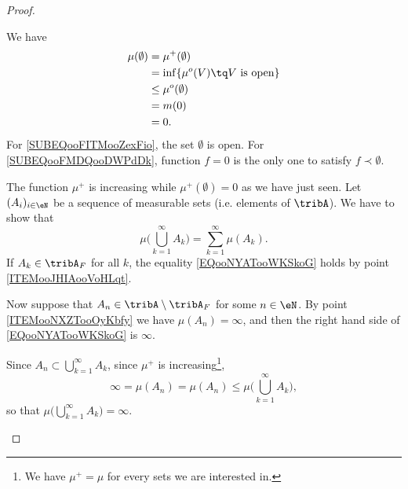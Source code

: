 \begin{proof}
\begin{subproof}
            \begin{subproof}
                \spitem[\( \mu(0)=0\)]
                We have
                \begin{subequations}
                    \begin{align}
                        \mu(\emptyset)&=\mu^+(\emptyset)\\
                        &=\inf\{ \mu^o(V)\tq \text{\( V\) is open} \}\\
                        &\leq \mu^o(\emptyset)   \label{SUBEQooFITMooZexFio}\\
                        &= m(0)      \label{SUBEQooFMDQooDWPdDk}\\
                        &=0.
                    \end{align}
                \end{subequations}
                For \eqref{SUBEQooFITMooZexFio}, the set \( \emptyset\) is open. For \eqref{SUBEQooFMDQooDWPdDk}, function \( f=0\) is the only one to satisfy \( f\prec\emptyset\).
                 
                The function \( \mu^+\) is increasing while \( \mu^+(\emptyset)= 0\) as we have just seen.
                Let \( (A_i)_{i\in \eN}\) be a sequence of measurable sets (i.e. elements of \( \tribA\)). We have to show that
                \begin{equation}        \label{EQooNYATooWKSkoG}
                    \mu\big( \bigcup_{k=1}^{\infty}A_k \big)=\sum_{k=1}^{\infty}\mu(A_k).
                \end{equation}
                If \( A_k\in\tribA_F\) for all \( k\), the equality \eqref{EQooNYATooWKSkoG} holds by point \ref{ITEMooJHIAooVoHLqt}.

                Now suppose that \( A_n\in\tribA\setminus\tribA_F\) for some \( n\in \eN\). By point \ref{ITEMooNXZTooOyKbfy} we have \( \mu(A_n)=\infty\), and then the right hand side of \eqref{EQooNYATooWKSkoG} is \( \infty\).

                Since \( A_n\subset\bigcup_{k=1}^{\infty}A_k\), since \( \mu^+\) is increasing\footnote{We have \( \mu^+=\mu\) for every sets we are interested in.},
                \begin{equation}
                    \infty=\mu(A_n) =\mu(A_n) \leq \mu\big( \bigcup_{k=1}^{\infty}A_k \big),
                \end{equation}
                so that \( \mu\big( \bigcup_{k=1}^{\infty}A_k \big)=\infty\).
            \end{subproof}
            

\end{subproof}
\end{proof}
